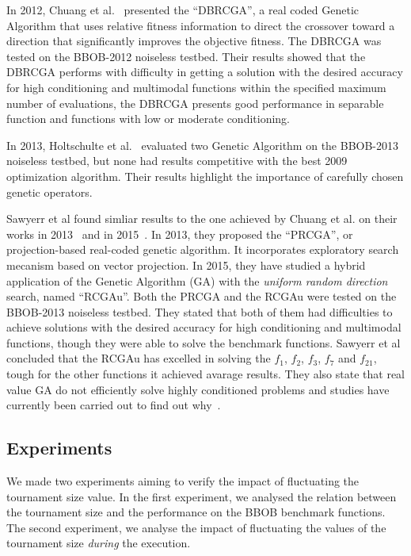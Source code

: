 In 2012, Chuang et al.~\cite{chuang2012black} presented the ``DBRCGA'', a real coded Genetic Algorithm that uses relative fitness information to direct the crossover toward a direction that significantly improves the objective fitness. The DBRCGA was tested on the BBOB-2012 noiseless testbed. Their results showed that the DBRCGA performs with difficulty in getting a solution with the desired accuracy for high conditioning and multimodal functions within the specified maximum number of evaluations, the DBRCGA presents good performance in separable function and functions with low or moderate conditioning.

In 2013, Holtschulte et al.~\cite{holtschulte2013benchmarking} evaluated two Genetic Algorithm on the BBOB-2013 noiseless testbed, but none had results competitive with the best 2009 optimization algorithm. Their results highlight the importance of carefully chosen genetic operators.

Sawyerr et al found simliar results to the one achieved by Chuang et al. on their works in 2013~\cite{sawyerr2013benchmarking} and in 2015~\cite{sawyerr2015benchmarking}. In 2013, they proposed the ``PRCGA'', or projection-based real-coded genetic algorithm. It incorporates exploratory search mecanism based on vector projection. In 2015, they have studied a hybrid application of the Genetic Algorithm (GA) with the \textit{uniform random direction} search, named ``RCGAu''. Both the PRCGA and the RCGAu were tested on the BBOB-2013 noiseless testbed. They stated that both of them had difficulties to achieve solutions with the desired accuracy for high conditioning and multimodal functions, though they were able to solve the benchmark functions.  Sawyerr et al concluded that the RCGAu has excelled in solving the $f_1$, $f_2$, $f_3$, $f_7$ and $f_{21}$, tough for the other functions it achieved avarage results. They also state that real value GA do not efficiently solve highly conditioned problems and studies have currently been carried out to find out why~\cite{sawyerr2015benchmarking}.




\label{sec:experiment}

\subsection{Experiments}
We made two experiments aiming to verify the impact of fluctuating the tournament size value. In the first experiment, we analysed the relation between the tournament size and the performance on the BBOB benchmark functions. The second experiment, we analyse the impact of fluctuating the values of the tournament size \textit{during} the execution.

